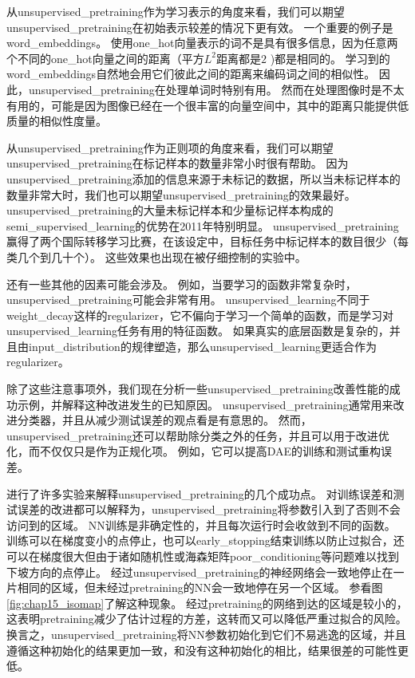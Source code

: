 
从\gls{unsupervised_pretraining}作为学习表示的角度来看，我们可以期望\gls{unsupervised_pretraining}在初始表示较差的情况下更有效。
一个重要的例子是\gls{word_embeddings}。
使用\gls{one_hot}向量表示的词不是具有很多信息，因为任意两个不同的\gls{one_hot}向量之间的距离（平方$L^2$距离都是$2$ )都是相同的。
学习到的\gls{word_embeddings}自然地会用它们彼此之间的距离来编码词之间的相似性。
因此，\gls{unsupervised_pretraining}在处理单词时特别有用。
然而在处理图像时是不太有用的，可能是因为图像已经在一个很丰富的向量空间中，其中的距离只能提供低质量的相似性度量。


从\gls{unsupervised_pretraining}作为正则项的角度来看，我们可以期望\gls{unsupervised_pretraining}在标记样本的数量非常小时很有帮助。
因为\gls{unsupervised_pretraining}添加的信息来源于未标记的数据，所以当未标记样本的数量非常大时，我们也可以期望\gls{unsupervised_pretraining}的效果最好。
\gls{unsupervised_pretraining}的大量未标记样本和少量标记样本构成的\gls{semi_supervised_learning}的优势在2011年特别明显。
\gls{unsupervised_pretraining}赢得了两个国际转移学习比赛\citep{UTLC+LISA-2011-small,goodfellow+all-NIPS2011}，在该设定中，目标任务中标记样本的数目很少（每类几个到几十个）。
这些效果也出现在被\citep{paine2014analysis}仔细控制的实验中。


还有一些其他的因素可能会涉及。
例如，当要学习的函数非常复杂时，\gls{unsupervised_pretraining}可能会非常有用。
\gls{unsupervised_learning}不同于\gls{weight_decay}这样的\gls{regularizer}，它不偏向于学习一个简单的函数，而是学习对\gls{unsupervised_learning}任务有用的特征函数。
如果真实的底层函数是复杂的，并且由\gls{input_distribution}的规律塑造，那么\gls{unsupervised_learning}更适合作为\gls{regularizer}。


除了这些注意事项外，我们现在分析一些\gls{unsupervised_pretraining}改善性能的成功示例，并解释这种改进发生的已知原因。
\gls{unsupervised_pretraining}通常用来改进分类器，并且从减少测试误差的观点看是有意思的。
然而，\gls{unsupervised_pretraining}还可以帮助除分类之外的任务，并且可以用于改进优化，而不仅仅只是作为正规化项。
例如，它可以提高\gls{DAE}的训练和测试重构误差\citep{Hinton-Science2006}。


\cite{Erhan+al-2010-small}进行了许多实验来解释\gls{unsupervised_pretraining}的几个成功点。
对训练误差和测试误差的改进都可以解释为，\gls{unsupervised_pretraining}将参数引入到了否则不会访问到的区域。
\gls{NN}训练是非确定性的，并且每次运行时会收敛到不同的函数。
训练可以在梯度变小的点停止，也可以\gls{early_stopping}结束训练以防止过拟合，还可以在梯度很大但由于诸如随机性或海森矩阵\gls{poor_conditioning}等问题难以找到下坡方向的点停止。
经过\gls{unsupervised_pretraining}的神经网络会一致地停止在一片相同的区域，但未经过\gls{pretraining}的\gls{NN}会一致地停在另一个区域。
参看图\ref{fig:chap15_isomap}了解这种现象。
经过\gls{pretraining}的网络到达的区域是较小的，这表明\gls{pretraining}减少了估计过程的方差，这转而又可以降低严重过拟合的风险。
换言之，\gls{unsupervised_pretraining}将\gls{NN}参数初始化到它们不易逃逸的区域，并且遵循这种初始化的结果更加一致，和没有这种初始化的相比，结果很差的可能性更低。



